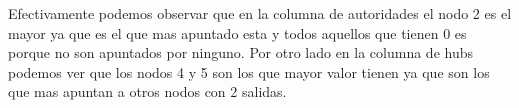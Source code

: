 Efectivamente podemos observar que en la columna de autoridades el nodo 2 es el mayor ya que es el que mas apuntado esta y todos aquellos que tienen 0 es porque no son apuntados por ninguno. Por otro lado en la columna de hubs podemos ver que los nodos 4 y 5 son los que mayor valor tienen ya que son los que mas apuntan a otros nodos con 2 salidas.
